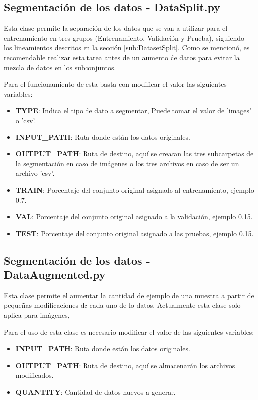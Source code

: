     \subsection{Segmentación de los datos - DataSplit.py}
    \label{sub:DataSplitClass}
        Esta clase permite la separación de los datos que se van a utilizar para el entrenamiento en tres grupos (Entrenamiento, Validación y Prueba), siguiendo los lineamientos descritos en la sección \ref{sub:DatasetSplit}. Como se mencionó, es recomendable realizar esta tarea antes de un aumento de datos para evitar la mezcla de datos en los subconjuntos.
        
        Para el funcionamiento de esta basta con modificar el valor las siguientes variables:
        \begin{itemize}
            \item \textbf{TYPE}: Indica el tipo de dato a segmentar, Puede tomar el valor de 'images' o 'csv'.
            \item \textbf{INPUT\_PATH}: Ruta donde están los datos originales.
            \item \textbf{OUTPUT\_PATH}: Ruta de destino, aquí se crearan las tres subcarpetas de la segmentación en caso de imágenes o los tres archivos en caso de ser un archivo 'csv'.
            \item \textbf{TRAIN}: Porcentaje del conjunto original asignado al entrenamiento, ejemplo 0.7.
            \item \textbf{VAL}: Porcentaje del conjunto original asignado a la validación, ejemplo 0.15.
            \item \textbf{TEST}: Porcentaje del conjunto original asignado a las pruebas, ejemplo 0.15.
        \end{itemize}
        
    \subsection{Segmentación de los datos - DataAugmented.py}
    \label{sub:DataAugmentedClass}
        Esta clase permite el aumentar la cantidad de ejemplo de una muestra a partir de pequeñas modificaciones de cada uno de lo datos. Actualmente esta clase solo aplica para imágenes,
        
        Para el uso de esta clase es necesario modificar el valor de las siguientes variables:
        \begin{itemize}
            \item \textbf{INPUT\_PATH}: Ruta donde están los datos originales.
            \item \textbf{OUTPUT\_PATH}: Ruta de destino, aquí se almacenarán los archivos modificados.
            \item \textbf{QUANTITY}: Cantidad de datos nuevos a generar.
        \end{itemize}
    
    \newpage

